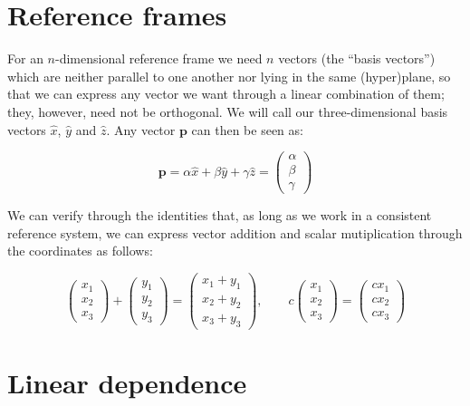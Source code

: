 \documentclass[12pt,a4paper]{report}
\numberwithin{equation}{section}
\theoremstyle{definition}
\theoremstyle{remark}
\begin{document}
\section{Reference frames}

For an $n$-dimensional reference frame we need $n$ vectors (the ``basis vectors'') which are neither parallel to one another nor lying in the same (hyper)plane, so that we can express any vector we want through a linear combination of them; they, however, need not be orthogonal.
We will call our three-dimensional basis vectors $\hat{x}$, $\hat{y}$ and $\hat{z}$. Any vector $\mathbf{p}$ can then be seen as:

\begin{equation}
\mathbf{p} = \alpha \hat{x} + \beta \hat{y} + \gamma \hat{z} = \begin{pmatrix}
\alpha \\ \beta \\ \gamma
\end{pmatrix}
\end{equation}

We can verify through the identities that, as long as we work in a consistent reference system, we can express vector addition and scalar mutiplication through the coordinates as follows:

\begin{equation}
\begin{pmatrix}
x_1 \\ x_2 \\ x_3
\end{pmatrix}
+
\begin{pmatrix}
y_1 \\ y_2 \\ y_3
\end{pmatrix}
=
\begin{pmatrix}
x_1 + y_1 \\ x_2 + y_2 \\ x_3 + y_3
\end{pmatrix},
\qquad
c
\begin{pmatrix}
x_1 \\ x_2 \\ x_3
\end{pmatrix}
=
\begin{pmatrix}
c x_1 \\ c x_2 \\ c x_3
\end{pmatrix}
\end{equation}

\section{Linear dependence}
\end{document}
